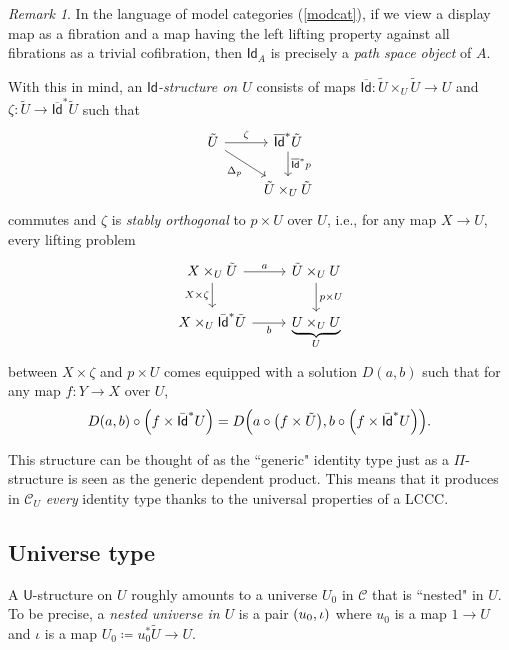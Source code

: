 \documentclass[10pt,letterpaper,cm]{nupset}
\theoremstyle{definition}
\theoremstyle{theorem}
\theoremstyle{remark}
\newtheorem{remark}[definition]{Remark}
\newcommand{\id}{\mathsf{Id}}
\newcommand{\U}{\mathsf{U}}
\newcommand{\0}{\mathbf{0}}
\newcommand{\1}{\mathbf{1}}
\newcommand{\2}{\mathbf{2}}
\renewcommand{\c}{\mathscr{C}}
\begin{document}
\begin{remark}\label{fibfact}
In the language of model categories (\cref{modcat}), if we view a  display map  as a fibration and a map having the left lifting property against all fibrations as a trivial cofibration, then $\id_A$ is precisely a \textit{path space object} of $A$.
\end{remark}

\medskip

With this in mind, an \textit{$\id$-structure on $U$} consists of maps  $\overline{\id}: \tilde{U} \times_U \tilde{U} \to U$ and $\zeta : \tilde{U} \to \overline{\id}^{\ast}{\tilde{U}}$ such that 
\[
\begin{tikzcd}
\tilde{U} \arrow[rd, "\Delta_p"'] \arrow[r, "\zeta"] & \overline{\id}^{\ast}{\tilde{U}} \arrow[d, "\overline{\id}^{\ast}{p}"] \\
                                                              & \tilde{U}\times_U\tilde{U}                                            
\end{tikzcd}
\] commutes and $\zeta$ is \textit{stably orthogonal} to $p \times U$ over $U$, i.e., for any map $X\to U$, every lifting problem
\[
\begin{tikzcd}
X\times_U \tilde{U} \arrow[d, "X\times \zeta"'] \arrow[r, "a"] & \tilde{U}\times_U U \arrow[d, "p \times U"] \\
X\times_U \bar{\id}^{\ast}{\tilde{U}} \arrow[r, "b"']         & \underbrace{U \times_U U}_{U}                               
\end{tikzcd}
\] between $X \times \zeta$ and $p \times U$ comes equipped with a solution $D(a,b)$ 
such that for any map $f: Y \to X$ over $U$,
\[
D\mleft(a,b\mright) \circ \mleft(f \times \bar{\id}^{\ast}{U} \mright) = D\mleft(a \circ \mleft(f \times \tilde{U}\mright), b\circ \mleft(f \times \bar{\id}^{\ast}{U}\mright)\mright)
.\]


\medskip

This structure can be thought of as the ``generic" identity type just as a $\Pi$-structure is seen as the generic dependent product. This means that it produces  in $\c_U$ \emph{every} identity type thanks to the universal properties of a LCCC. 

\subsection*{Universe type}\label{internaluniv}

A $\U$-structure on $U$ roughly amounts to a universe $U_0$ in $\c$ that is ``nested" in $U$. To be precise, a \textit{nested universe in $U$} is a pair $\mleft(u_0, \iota\mright)$ where $u_0$ is a map $1 \to U$ and $\iota$ is a map $U_0 \coloneqq u_0^{\ast}{\tilde{U}} \to U$. 
\end{document}
